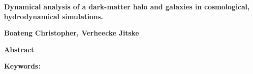 \thispagestyle{plain}
\begin{center}
    \Large
    \textbf{Dynamical analysis of a dark-matter halo and galaxies in cosmological, hydrodynamical simulations.}

    \vspace{0.4cm}
    \textbf{Boateng Christopher, Verheecke Jitske}
    
    \vspace{0.9cm}
    \textbf{Abstract}
\end{center}

\vspace{0.5cm}
\noindent\textbf{Keywords:}